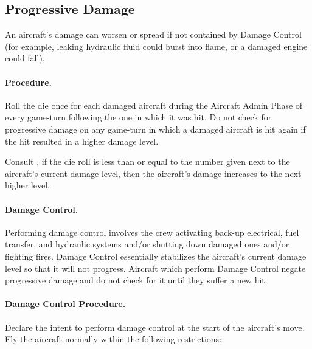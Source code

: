 \begin{advancedrules}

\section{Progressive Damage}
\label{rule:progressive-damage}


An aircraft's damage can worsen or spread if not contained by Damage Control (for example, leaking hydraulic fluid could burst into flame, or a damaged engine could fall).

\paragraph{Procedure.} Roll the die once for each damaged aircraft during the Aircraft Admin Phase of every game-turn following the one in which it was hit. Do not check for progressive damage on any game-turn in which a damaged aircraft is hit again if the hit resulted in a higher damage level.

Consult , if the die roll is less than or equal to the number given next to the aircraft's current damage level, then the aircraft's damage increases to the next higher level.

\paragraph{Damage Control.} Performing damage control involves the crew activating back-up electrical, fuel transfer, and hydraulic systems and/or shutting down damaged ones and/or fighting fires. Damage Control essentially stabilizes the aircraft's current damage level so that it will not progress. Aircraft which perform Damage Control negate progressive damage and do not check for it until they suffer a new hit.

\paragraph{Damage Control Procedure.} Declare the intent to perform damage control at the start of the aircraft's move. Fly the aircraft normally within the following restrictions:


\end{advancedrules}
